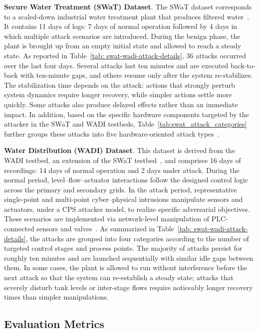 \documentclass[pdflatex,sn-mathphys-num]{sn-jnl}%
\theoremstyle{thmstyleone}
\theoremstyle{thmstyletwo}%
\theoremstyle{thmstylethree}%
\begin{document}
\textbf{Secure Water Treatment (SWaT) Dataset}. The SWaT dataset corresponds to a scaled-down industrial water treatment plant that produces filtered water~\cite{mathur2016swat}.
It contains 11 days of logs: 7 days of normal operation followed by 4 days in which multiple attack scenarios are introduced. During the benign phase, the plant is brought up from an empty initial state and allowed to reach a steady state. As reported in Table~\ref{tab: swat-wadi-attack-details}, 36 attacks occurred over the last four days. Several attacks last ten minutes and are executed back-to-back with ten-minute gaps, and others resume only after the system re-stabilizes. The stabilization time depends on the attack: actions that strongly perturb system dynamics require longer recovery, while simpler actions settle more quickly. Some attacks also produce delayed effects rather than an immediate impact. In addition, based on the specific hardware components targeted by the attacker in the SWaT and WADI testbeds, Table~\ref{tab:swat_attack_categories} further groups these attacks into five hardware-oriented attack types~\cite{imanpourgoorabzarmakhidata}.


\textbf{Water Distribution (WADI) Dataset}. This dataset is derived from the WADI testbed, an extension of the SWaT testbed~\cite{ahmed2017wadi}, and comprises 16 days of recordings: 14 days of normal operation and 2 days under attack. During the normal period, level--flow--actuator interactions follow the designed control logic across the primary and secondary grids. In the attack period, representative single-point and multi-point cyber--physical intrusions manipulate sensors and actuators, under a CPS attacker model, to realize specific adversarial objectives. These scenarios are implemented via network-level manipulation of PLC-connected sensors and valves~\cite{adepu2019investigation}. As summarized in Table~\ref{tab: swat-wadi-attack-details}, the attacks are grouped into four categories according to the number of targeted control stages and process points. The majority of attacks persist for roughly ten minutes and are launched sequentially with similar idle gaps between them. In some cases, the plant is allowed to run without interference before the next attack so that the system can re-establish a steady state; attacks that severely disturb tank levels or inter-stage flows require noticeably longer recovery times than simpler manipulations.

\subsection{Evaluation Metrics}
\end{document}
